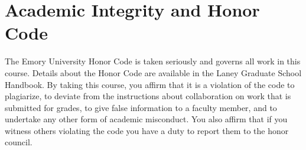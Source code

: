 \documentclass{article}
\begin{document}
\section*{Academic Integrity and Honor Code}
The Emory University Honor Code is taken seriously and governs all work in this course. Details about the Honor Code are available in the Laney Graduate School Handbook. By taking this course, you affirm that it is a violation of the code to plagiarize, to deviate from the instructions about collaboration on work that is submitted for grades, to give false information to a faculty member, and to undertake any other form of academic misconduct. You also affirm that if you witness others violating the code you have a duty to report them to the honor council.

\pagebreak


\end{document}
